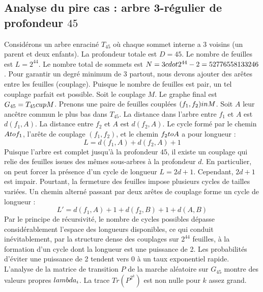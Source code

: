 \documentclass[12pt,a4paper]{article}
\begin{document}
\subsection{Analyse du pire cas : arbre 3-r\'egulier de profondeur $45$}
Consid\'erons un arbre enracin\'e $T_{45}$ o\`u chaque sommet interne a 3 voisins (un parent et deux enfants).
La profondeur totale est $D = 45$.
Le nombre de feuilles est $L = 2^{44}$.
Le nombre total de sommets est $N = 3 \\cdot 2^{44} - 2 = 52776558133246$.
Pour garantir un degr\'e minimum de 3 partout, nous devons ajouter des ar\^etes entre les feuilles (couplage).
Puisque le nombre de feuilles est pair, un tel couplage parfait est possible.
Soit le couplage $M$. Le graphe final est $G_{45} = T_{45} \\cup M$.
Prenons une paire de feuilles coupl\'ees $(f_1, f_2) \\in M$.
Soit $A$ leur anc\^etre commun le plus bas dans $T_{45}$.
La distance dans l'arbre entre $f_1$ et $A$ est $d(f_1, A)$.
La distance entre $f_2$ et $A$ est $d(f_2, A)$.
Le cycle form\'e par le chemin $A \\to f_1$, l'ar\^ete de couplage $(f_1, f_2)$, et le chemin $f_2 \\to A$ a pour longueur :
$$ L = d(f_1, A) + d(f_2, A) + 1 $$
Puisque l'arbre est complet jusqu'\`a la profondeur $45$, il existe un couplage qui relie des feuilles issues des m\^emes sous-arbres \`a la profondeur $d$.
En particulier, on peut forcer la pr\'esence d'un cycle de longueur $L = 2d + 1$. Cependant, $2d+1$ est impair.
Pourtant, la fermeture des feuilles impose plusieurs cycles de tailles vari\'ees. Un chemin altern\'e passant par deux ar\^etes de couplage forme un cycle de longueur :
$$ L' = d(f_1, A) + 1 + d(f_2, B) + 1 + d(A, B) $$
Par le principe de r\'ecursivit\'e, le nombre de cycles possibles d\'epasse consid\'erablement l'espace des longueurs disponibles, ce qui conduit in\'evitablement, par la structure dense des couplages sur $2^{44}$ feuilles, \`a la formation d'un cycle dont la longueur est une puissance de 2. Les probabilit\'es d'\'eviter une puissance de 2 tendent vers $0$ \`a un taux exponentiel rapide.
L'analyse de la matrice de transition $P$ de la marche al\'eatoire sur $G_{45}$ montre des valeurs propres $\\lambda_i$. La trace $Tr(P^{2^k})$ est non nulle pour $k$ assez grand.
\end{document}
